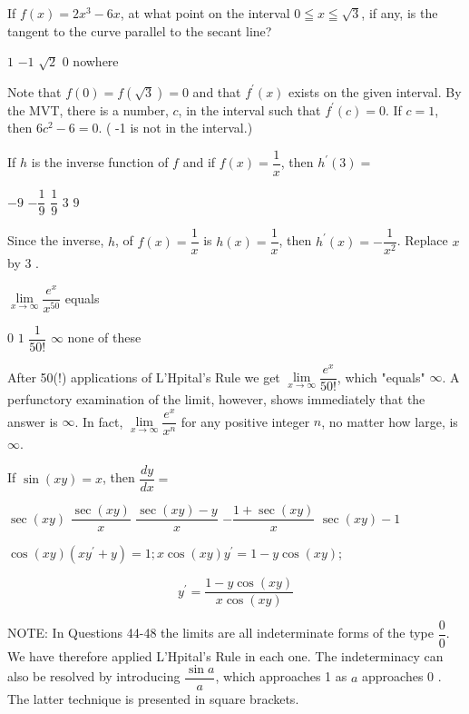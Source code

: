 \question
If $f(x)=2 x^{3}-6 x$, at what point on the interval $0 \leqq x \leqq \sqrt{3}$, if any, is the tangent to the curve parallel to the secant line?
\begin{choices}
  \CorrectChoice $1$
  \choice $-1$
  \choice $\sqrt{2}$
  \choice $0$
  \choice nowhere
\end{choices}
\begin{solution}
Note that $f(0)=f(\sqrt{3})=0$ and that $f^{\prime}(x)$ exists on the given interval. By the MVT, there is a number, $c$, in the interval such that $f^{\prime}(c)=0$. If $c=1$, then $6 c^{2}-6=0$. ( -1 is not in the interval.)
\end{solution}

\question
If $h$ is the inverse function of $f$ and if $f(x)=\dfrac{1}{x}$, then $h^{\prime}(3)=$
\begin{choices}
  \choice $-9$
  \CorrectChoice $-\dfrac{1}{9}$
  \choice $\dfrac{1}{9}$
  \choice $3$
  \choice $9$
\end{choices}
\begin{solution}
Since the inverse, $h$, of $f(x)=\dfrac{1}{x}$ is $h(x)=\dfrac{1}{x}$, then $h^{\prime}(x)=-\dfrac{1}{x^{2}}$. Replace $x$ by 3 .
\end{solution}




\newpage




\question
$\lim\limits_{x \to \infty} \dfrac{e^{x}}{x^{50}}$ equals
\begin{choices}
  \choice $0$
  \choice $1$
  \choice $\dfrac{1}{50!}$
  \CorrectChoice $\infty$
  \choice none of these
\end{choices}
\begin{solution}
After 50(!) applications of L'Hpital's Rule we get $\lim\limits_{x \to \infty} \dfrac{e^{x}}{50!}$, which "equals" $\infty$. A perfunctory examination of the limit, however, shows immediately that the answer is $\infty$. In fact, $\lim\limits_{x \to \infty} \dfrac{e^{x}}{x^{n}}$ for any positive integer $n$, no matter how large, is $\infty$.
\end{solution}

\question
If $\sin (x y)=x$, then $\dfrac{d y}{d x}=$
\begin{choices}
  \choice $\sec (x y)$
  \choice $\dfrac{\sec (x y)}{x}$
  \CorrectChoice $\dfrac{\sec (x y)-y}{x}$
  \choice $-\dfrac{1+\sec (x y)}{x}$
  \choice $\sec (x y)-1$
\end{choices}
\begin{solution}
$\cos (x y)\left(x y^{\prime}+y\right)=1 ; x \cos (x y) y^{\prime}=1-y \cos (x y)$;


\[
y^{\prime}=\dfrac{1-y \cos (x y)}{x \cos (x y)}
\]

NOTE: In Questions 44-48 the limits are all indeterminate forms of the type $\dfrac{0}{0}$. We have therefore applied L'Hpital's Rule in each one. The indeterminacy can also be resolved by introducing $\dfrac{\sin a}{a}$, which approaches 1 as $a$ approaches 0 . The latter technique is presented in square brackets.
\end{solution}

